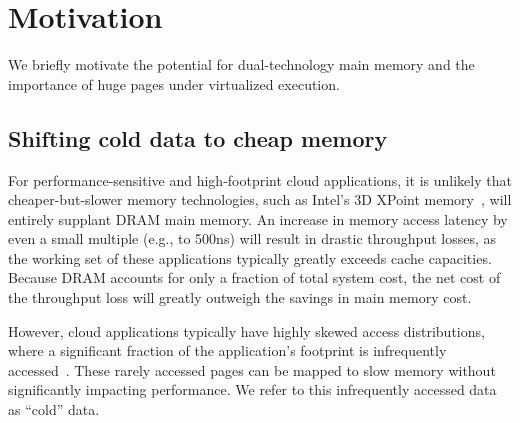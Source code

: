 \section{Motivation}
\label{motivation}

We briefly motivate the potential for dual-technology main memory and the importance of huge pages under virtualized execution.

%

\subsection{Shifting cold data to cheap memory}
\label{analytic-model}

For performance-sensitive and high-footprint cloud applications, it is unlikely that cheaper-but-slower
memory technologies, such as Intel's 3D XPoint memory~\cite{3dcrosspoint}, will 
entirely supplant DRAM main memory.
An increase in memory access latency by even a small multiple (e.g., to 500ns)
will result in drastic throughput losses, as the working set of these applications typically
greatly exceeds cache capacities.
Because DRAM accounts for only a fraction of total system cost, the net cost of the
throughput loss will greatly outweigh the savings in main memory cost.

However, cloud applications typically have highly skewed access distributions, where
a significant fraction of the application's footprint is infrequently
accessed~\cite{ycsb}.
These rarely accessed pages can be mapped to slow memory without significantly impacting performance.
We refer to this infrequently accessed data as ``cold'' data.

